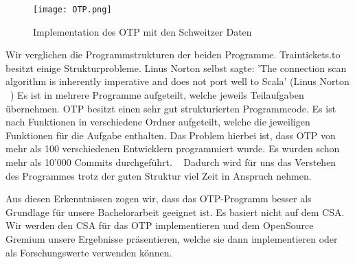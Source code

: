 \begin{figure}[]
	\centering
	\texttt{[image: OTP.png]}
	\caption{Implementation des OTP mit den Schweitzer Daten}
	\label{fig:OTP}
\end{figure}

Wir verglichen die Programmstrukturen der beiden Programme. Traintickets.to besitzt einige Strukturprobleme. Linus Norton selbst sagte: 'The connection scan algorithm is inherently imperative and does not port well to Scala' (Linus Norton ~\cite{traintickets_git_pattern}) Es ist in mehrere Programme aufgeteilt, welche jeweils Teilaufgaben übernehmen. OTP besitzt einen sehr gut strukturierten Programmcode. Es ist nach Funktionen in verschiedene Ordner aufgeteilt, welche die jeweiligen Funktionen für die Aufgabe enthalten. Das Problem hierbei ist, dass OTP von mehr als 100 verschiedenen Entwicklern programmiert wurde. Es wurden schon mehr als 10'000 Commits durchgeführt. ~\cite{otp_website} Dadurch wird für uns das Verstehen des Programmes trotz der guten Struktur viel Zeit in Anspruch nehmen. 

Aus diesen Erkenntnissen zogen wir, dass das OTP-Programm besser als Grundlage für unsere Bachelorarbeit geeignet ist. Es basiert nicht auf dem CSA. Wir werden den CSA für das OTP implementieren und dem OpenSource Gremium unsere Ergebnisse präsentieren, welche sie dann implementieren oder als Forschungswerte verwenden können.
 

